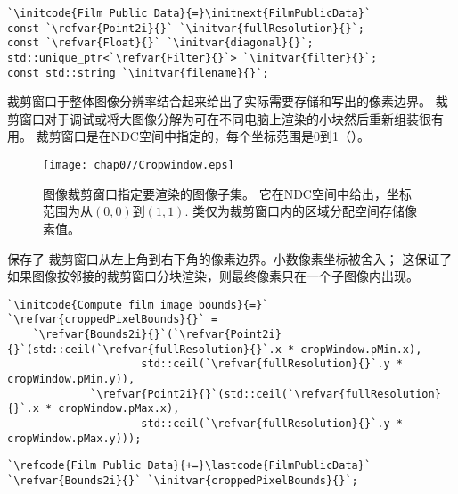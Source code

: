 \begin{lstlisting}
`\initcode{Film Public Data}{=}\initnext{FilmPublicData}`
const `\refvar{Point2i}{}` `\initvar{fullResolution}{}`;
const `\refvar{Float}{}` `\initvar{diagonal}{}`;
std::unique_ptr<`\refvar{Filter}{}`> `\initvar{filter}{}`;
const std::string `\initvar{filename}{}`;
\end{lstlisting}

裁剪窗口于整体图像分辨率结合起来给出了实际需要存储和写出的像素边界。
裁剪窗口对于调试或将大图像分解为可在不同电脑上渲染的小块然后重新组装很有用。
裁剪窗口是在NDC空间中指定的，每个坐标范围是0到1（）。
\begin{figure}[htbp]
    \centering\texttt{[image: chap07/Cropwindow.eps]}
    \caption{图像裁剪窗口指定要渲染的图像子集。
    它在NDC空间中给出，坐标范围为从$(0,0)$到$(1,1)$.
    类仅为裁剪窗口内的区域分配空间存储像素值。}
    \label{fig:7.47}
\end{figure}

保存了
裁剪窗口从左上角到右下角的像素边界。小数像素坐标被舍入；
这保证了如果图像按邻接的裁剪窗口分块渲染，则最终像素只在一个子图像内出现。
\begin{lstlisting}
`\initcode{Compute film image bounds}{=}`
`\refvar{croppedPixelBounds}{}` =
    `\refvar{Bounds2i}{}`(`\refvar{Point2i}{}`(std::ceil(`\refvar{fullResolution}{}`.x * cropWindow.pMin.x),
                     std::ceil(`\refvar{fullResolution}{}`.y * cropWindow.pMin.y)),
             `\refvar{Point2i}{}`(std::ceil(`\refvar{fullResolution}{}`.x * cropWindow.pMax.x),
                     std::ceil(`\refvar{fullResolution}{}`.y * cropWindow.pMax.y)));
\end{lstlisting}
\begin{lstlisting}
`\refcode{Film Public Data}{+=}\lastcode{FilmPublicData}`
`\refvar{Bounds2i}{}` `\initvar{croppedPixelBounds}{}`;
\end{lstlisting}

